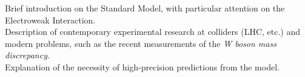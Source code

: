 Brief introduction on the Standard Model, with particular attention on the Electroweak Interaction.\\
Description of contemporary experimental research at colliders (LHC, etc.) and modern problems, such as the recent measurements of the \textit{W boson mass discrepancy}. \\
Explanation of the necessity of high-precision predictions from the model. 